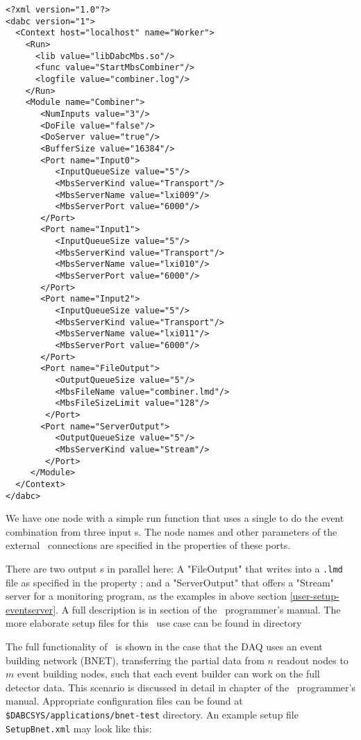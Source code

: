 \begin{small}
\begin{verbatim}
<?xml version="1.0"?>
<dabc version="1">
  <Context host="localhost" name="Worker">
    <Run>
      <lib value="libDabcMbs.so"/>
      <func value="StartMbsCombiner"/>
      <logfile value="combiner.log"/>
    </Run>
    <Module name="Combiner">
       <NumInputs value="3"/>
       <DoFile value="false"/>
       <DoServer value="true"/>
       <BufferSize value="16384"/>
       <Port name="Input0">
          <InputQueueSize value="5"/>
          <MbsServerKind value="Transport"/>
          <MbsServerName value="lxi009"/>
          <MbsServerPort value="6000"/>
       </Port>
       <Port name="Input1">
          <InputQueueSize value="5"/>
          <MbsServerKind value="Transport"/>
          <MbsServerName value="lxi010"/>
          <MbsServerPort value="6000"/>
       </Port>
       <Port name="Input2">
          <InputQueueSize value="5"/>
          <MbsServerKind value="Transport"/>
          <MbsServerName value="lxi011"/>
          <MbsServerPort value="6000"/>
       </Port>
       <Port name="FileOutput">
          <OutputQueueSize value="5"/>
          <MbsFileName value="combiner.lmd"/>
          <MbsFileSizeLimit value="128"/>
        </Port>
       <Port name="ServerOutput">
          <OutputQueueSize value="5"/>
          <MbsServerKind value="Stream"/>
        </Port>
     </Module>
  </Context>
</dabc>
\end{verbatim}
\end{small}

We have one node  with a simple run function 
 that uses a single  to do the
event combination from three input s.
The node names and other parameters of the external \mbs\ connections
are specified in the  properties of these ports.

There are two output s in parallel here: A "FileOutput"
that writes into a {\tt *.lmd} file as specified in the property 
; and a "ServerOutput" that offers a "Stream" server
for a monitoring program, as the examples in above section \ref{user-setup-eventserver}.
A full description is in section
 of the \dabc\ programmer's manual.
The more elaborate setup files for this \mbs\ use case can be found 
in directory

The full functionality of \dabc\ is shown in the case that the DAQ uses
an event building network (BNET), transferring the partial data from $n$ readout nodes
to $m$ event building nodes, such that each event builder can work on the full
detector data. This scenario is discussed in detail in chapter 
of the \dabc\ programmer's manual. Appropriate configuration files can be found at \\
{\tt \$DABCSYS/applications/bnet-test} directory.
An example setup file {\tt SetupBnet.xml} may look like this:

